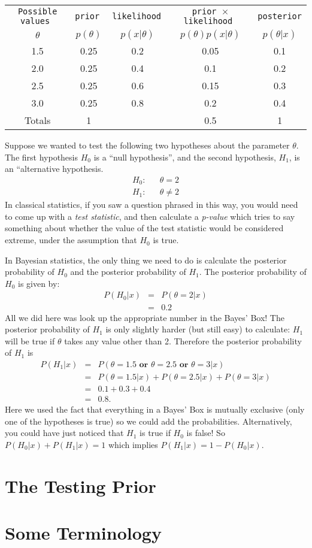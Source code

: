 \begin{table}[h!]
\begin{center}
\begin{tabular}{|c|c|c|c|c|}
\hline
\tt{Possible values} & \tt{prior} & \tt{likelihood} & \tt{prior} $\times$ \tt{likelihood} & \tt{posterior}\\
$\theta$ & $p(\theta)$ & $p(x|\theta)$ & $p(\theta)p(x|\theta)$ & $p(\theta|x)$\\
\hline
1.5 & 0.25 & 0.2 & 0.05 & 0.1\\
2.0 & 0.25 & 0.4 & 0.1 & 0.2\\
2.5 & 0.25 & 0.6 & 0.15 & 0.3\\
3.0 & 0.25 & 0.8 & 0.2 & 0.4\\
\hline
Totals & 1 & & 0.5 & 1\\
\hline
\end{tabular}
\end{center}
\end{table}
Suppose we wanted to test the following two hypotheses about the parameter $\theta$.
The first hypothesis $H_0$ is a ``null hypothesis'', and the second hypothesis,
$H_1$, is an ``alternative hypothesis.
\begin{eqnarray}
H_0: && \theta = 2\\
H_1: && \theta \neq 2
\end{eqnarray}
In classical statistics, if you saw a question phrased in this way, you would
need to come up with a {\it test statistic},
and then calculate a {\it p-value} which tries to say something about whether
the value of the test statistic would be considered extreme, under the
assumption that $H_0$ is true.

In Bayesian statistics, the only thing we need to do is calculate
the posterior probability of $H_0$ and the posterior probability of $H_1$.
The posterior probability of $H_0$ is given by:
\begin{eqnarray}
P(H_0|x) &=& P(\theta = 2|x)\\
&=& 0.2
\end{eqnarray}
All we did here was look up the appropriate number in the Bayes' Box! The
posterior probability of $H_1$ is only slightly harder (but still easy)
to calculate: $H_1$ will
be true if $\theta$ takes any value other than 2. Therefore the posterior
probability of $H_1$ is
\begin{eqnarray}
P(H_1|x) &=& P(\theta = 1.5 \textbf{ or } \theta = 2.5 \textbf{ or } \theta = 3|x)\\
&=& P(\theta = 1.5|x) + P(\theta = 2.5|x) + P(\theta = 3|x)\\
&=& 0.1 + 0.3 + 0.4\\
&=& 0.8.
\end{eqnarray}
Here we used the fact that everything in a Bayes' Box is mutually exclusive
(only one of the hypotheses is true) so we could add the probabilities.
Alternatively, you could have just noticed that $H_1$ is true if $H_0$ is false!
So $P(H_0|x) + P(H_1|x) = 1$ which implies $P(H_1|x) = 1 - P(H_0|x)$.

\section{The Testing Prior}


\section{Some Terminology}

